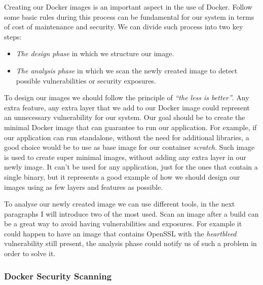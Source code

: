 \documentclass[a4paper,12pt]{article}
\begin{document}
Creating our Docker images is an important aspect in the use of Docker. Follow
some basic rules during this process can be fundamental for our system in terms
of cost of maintenance and security. We can divide such process into two key
steps: 
\begin{itemize}
  \item \textit{The design phase} in which we structure our image.
  \item \textit{The analysis phase} in which we scan the newly created image to
  detect possible vulnerabilities or security exposures.
\end{itemize}
To design our images we should follow the principle of \textit{``the less is
better''}. Any extra feature, any extra layer that we add to our Docker image
could represent an unnecessary vulnerability for our system. Our goal should be
to create the minimal Docker image that can guarantee to run our application.
For example, if our application can run standalone, without the need for
additional libraries, a good choice would be to use as base image for our
container \textit{scratch}. Such image is used to create super minimal images,
without adding any extra layer in our newly image. It can't be used for any
application, just for the ones that contain a single binary, but it represents
a good example of how we should design our images using as few layers and
features as possible. \par To analyse our newly created image we can use
different tools, in the next paragraphs I will introduce two of the most used.
Scan an image after a build can be a great way to avoid having vulnerabilities
and exposures. For example it could happen to have an image that contains
OpenSSL with the \textit{heartbleed} vulnerability still present, the analysis phase
could notify us of such a problem in order to solve it. 

\subsubsection{Docker Security Scanning}
\end{document}
